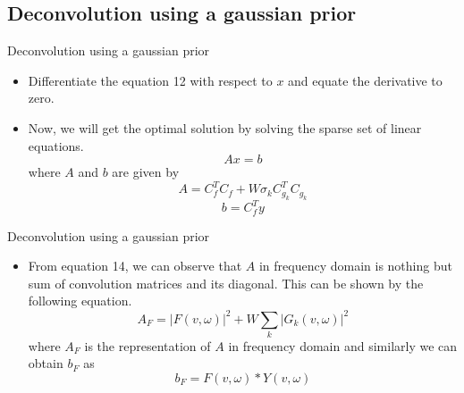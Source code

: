 \documentclass{beamer}
\begin{document}
\subsection{Deconvolution using a gaussian prior}
\begin{frame}{Deconvolution using a gaussian prior}
  \begin{itemize}
  \item {
   Differentiate the equation 12 with respect to $x$ and equate the derivative to zero. 
    \pause %
  }
  \item {   
    Now, we will get the optimal solution by solving the sparse set of linear equations.
\begin{equation}
Ax = b
\end{equation}
where $A$ and $b$ are given by
\begin{equation}
A = C_f^TC_f + W \sigma_k C_{g_k}^TC_{g_k}
\end{equation}
\begin{equation}
b = C_f^Ty
\end{equation}
  }
  
  
  \end{itemize}
\end{frame}

\begin{frame}{Deconvolution using a gaussian prior}
  \begin{itemize}
  \item {
   From equation 14, we can observe that $A$ in frequency domain is nothing but sum of convolution matrices and its diagonal. This can be shown by the following equation.
\begin{equation}
A_F = |F(v,\omega)|^2 + W \sum_k|G_k(v,\omega)|^2
\end{equation}
where $A_F$ is the representation of $A$ in frequency domain and similarly we can obtain $b_F$ as 
\begin{equation}
b_F = F(v,\omega)*Y(v,\omega)
\end{equation}
  }
  
  \end{itemize}
\end{frame}
\end{document}
